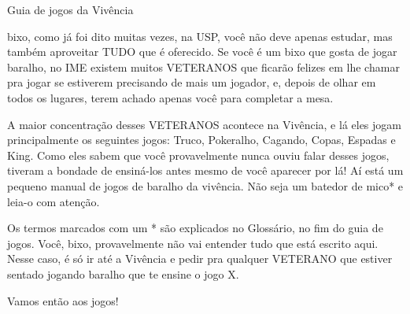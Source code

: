 \begin{secao}{Guia de jogos da Vivência }

bixo, como já foi dito muitas vezes, na USP, você não deve apenas estudar, mas
também aproveitar TUDO que é oferecido. Se você é um bixo que gosta de jogar
baralho, no IME existem muitos VETERANOS que ficarão felizes em lhe chamar pra
jogar se estiverem precisando de mais um jogador, e, depois de olhar em todos
os lugares, terem achado apenas você para completar a mesa. 

A maior concentração desses VETERANOS acontece na Vivência, e lá eles jogam
principalmente os seguintes jogos: Truco, Pokeralho, Cagando, Copas, Espadas e
King. Como eles sabem que você provavelmente nunca ouviu falar desses jogos,
tiveram a bondade de ensiná-los antes mesmo de você aparecer por lá! Aí está um
pequeno manual de jogos de baralho da vivência. Não seja um batedor de mico* e
leia-o com atenção. 

Os termos marcados com um * são explicados no Glossário, no fim do guia de
jogos. Você, bixo, provavelmente não vai entender tudo que está escrito aqui.
Nesse caso, é só ir até a Vivência e pedir pra qualquer VETERANO que estiver
sentado jogando baralho que te ensine o jogo X.

Vamos então aos jogos!








\end{secao}

